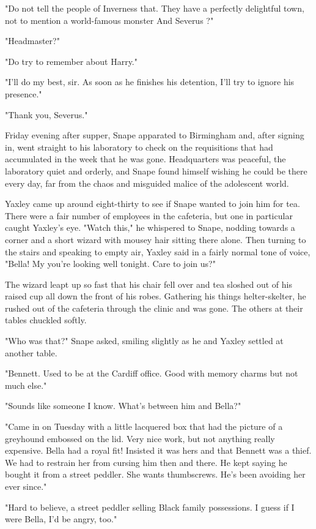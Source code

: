 "Do not tell the people of Inverness that. They have a perfectly delightful town, not to mention a world-famous monster{\el} And Severus{\el} ?"

"Headmaster?"

"Do try to remember about Harry."

"I'll do my best, sir. As soon as he finishes his detention, I'll try to ignore his presence."

"Thank you, Severus."

Friday evening after supper, Snape apparated to Birmingham and, after signing in, went straight to his laboratory to check on the requisitions that had accumulated in the week that he was gone. Headquarters was peaceful, the laboratory quiet and orderly, and Snape found himself wishing he could be there every day, far from the chaos and misguided malice of the adolescent world.

Yaxley came up around eight-thirty to see if Snape wanted to join him for tea. There were a fair number of employees in the cafeteria, but one in particular caught Yaxley's eye. "Watch this," he whispered to Snape, nodding towards a corner and a short wizard with mousey hair sitting there alone. Then turning to the stairs and speaking to empty air, Yaxley said in a fairly normal tone of voice, "Bella! My you're looking well tonight. Care to join us?"

The wizard leapt up so fast that his chair fell over and tea sloshed out of his raised cup all down the front of his robes. Gathering his things helter-skelter, he rushed out of the cafeteria through the clinic and was gone. The others at their tables chuckled softly.

"Who was that?" Snape asked, smiling slightly as he and Yaxley settled at another table.

"Bennett. Used to be at the Cardiff office. Good with memory charms but not much else."

"Sounds like someone I know. What's between him and Bella?"

"Came in on Tuesday with a little lacquered box that had the picture of a greyhound embossed on the lid. Very nice work, but not anything really expensive. Bella had a royal fit! Insisted it was hers and that Bennett was a thief. We had to restrain her from cursing him then and there. He kept saying he bought it from a street peddler. She wants thumbscrews. He's been avoiding her ever since."

"Hard to believe, a street peddler selling Black family possessions. I guess if I were Bella, I'd be angry, too."

